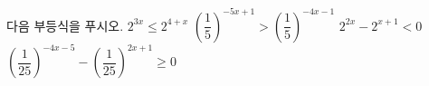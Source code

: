 다음 부등식을 푸시오.
 $2^{3x}\le 2^{4+x}$
 $\left(\dfrac{1}{5}\right)^{-5x+1}>\left(\dfrac{1}{5}\right)^{-4x-1}$
 $2^{2x}-2^{x+1}<0$
 $\left(\dfrac{1}{25}\right)^{-4x-5}-\left(\dfrac{1}{25}\right)^{2x+1}\ge 0$
